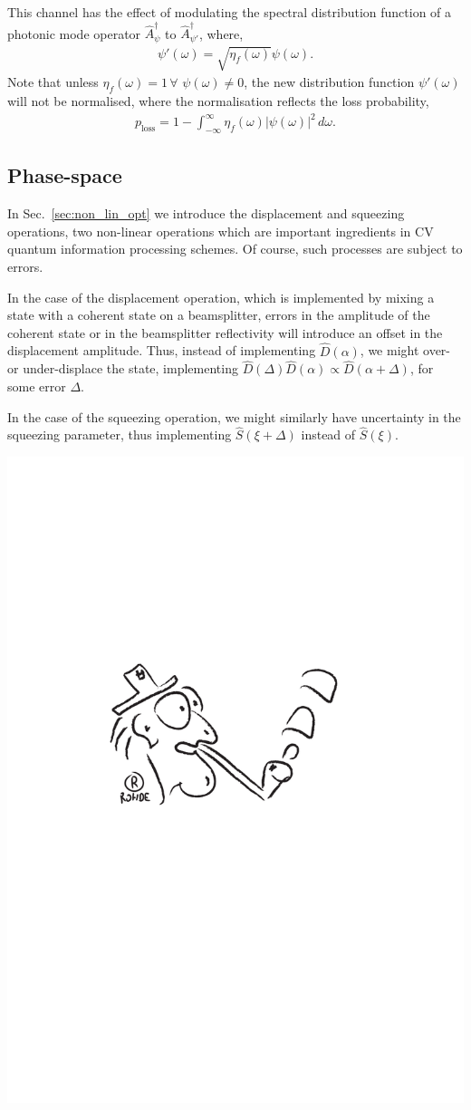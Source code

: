 \documentclass[aps, rmp, twocolumn, amsmath, amssymb, nofootinbib, superscriptaddress, longbibliography, floatfix, table-of-contents, eqsecnum]{revtex4-1}
\begin{document}
This channel has the effect of modulating the spectral distribution function of a photonic mode operator $\hat{A}_\psi^\dag$ to $\hat{A}_{\psi'}^\dag$, where,
\begin{align}
\psi'(\omega) = \sqrt{\eta_f(\omega)}\psi(\omega).	
\end{align}
Note that unless \mbox{$\eta_f(\omega)=1\,\forall\,\,\psi(\omega)\neq 0$}, the new distribution function $\psi'(\omega)$ will not be normalised, where the normalisation reflects the loss probability,
\begin{align}
p_\text{loss} = 1 - \int_{-\infty}^\infty \eta_f(\omega)|\psi(\omega)|^2\,d\omega.
\end{align}

%
%

\subsection{Phase-space} 

In Sec.~\ref{sec:non_lin_opt} we introduce the displacement and squeezing operations, two non-linear operations which are important ingredients in CV quantum information processing schemes. Of course, such processes are subject to errors.

In the case of the displacement operation, which is implemented by mixing a state with a coherent state on a beamsplitter, errors in the amplitude of the coherent state or in the beamsplitter reflectivity will introduce an offset in the displacement amplitude. Thus, instead of implementing $\hat{D}(\alpha)$, we might over- or under-displace the state, implementing \mbox{$\hat{D}(\Delta)\hat{D}(\alpha)\propto \hat{D}(\alpha+\Delta)$}, for some error $\Delta$.

In the case of the squeezing operation, we might similarly have uncertainty in the squeezing parameter, thus implementing $\hat{S}(\xi+\Delta)$ instead of $\hat{S}(\xi)$.

\begin{center}
	\includegraphics[width=0.6\columnwidth]{sketch_9}
\end{center}
\end{document}
